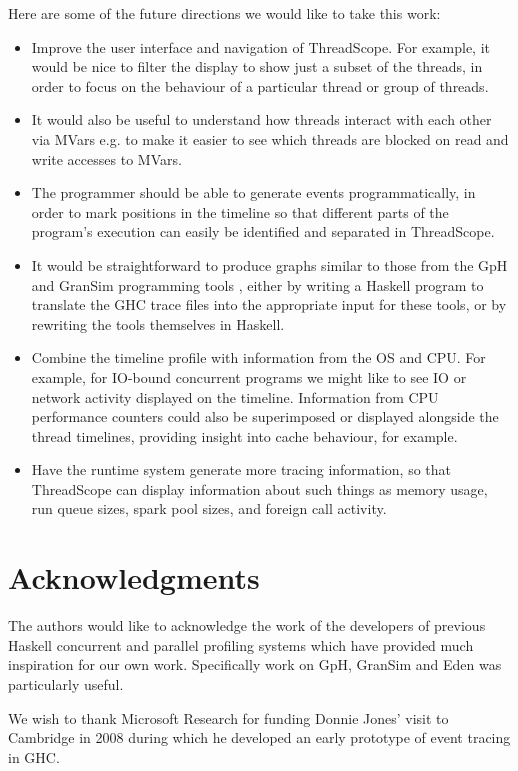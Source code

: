 \documentclass[twocolumn,9pt]{sigplanconf}
\newcommand{\codef}[1]{{\fontfamily{cmss}\small#1}}
\let\cite=\citep
\begin{document}
Here are some of the future directions we would like to take this
work:

\begin{itemize}
\item Improve the user interface and navigation of ThreadScope.  For
  example, it would be nice to filter the display to show just a
  subset of the threads, in order to focus on the behaviour of a
  particular thread or group of threads.

\item It would also be useful to understand how threads interact with each 
   other via \codef{MVars} e.g. to make it easier to see which 
   threads are blocked on read and write accesses to \codef{MVar}s.

\item The programmer should be able to generate events
  programmatically, in order to mark positions in the timeline so that
  different parts of the program's execution can easily be identified
  and separated in ThreadScope.

\item It would be straightforward to produce graphs similar to those
  from the GpH and GranSim programming tools \cite{trinder:02,loidl},
  either by writing a Haskell program to translate the GHC trace files
  into the appropriate input for these tools, or by rewriting the
  tools themselves in Haskell.

\item Combine the timeline profile with information from the OS and
  CPU.  For example, for IO-bound concurrent programs we might like to
  see IO or network activity displayed on the timeline.  Information
  from CPU performance counters could also be superimposed or
  displayed alongside the thread timelines, providing insight into
  cache behaviour, for example.

\item Have the runtime system generate more tracing information, so
  that ThreadScope can display information about such things as memory
  usage, run queue sizes, spark pool sizes, and foreign call activity.
\end{itemize}

\section*{Acknowledgments}

The authors would like to acknowledge the work of the developers
of previous Haskell concurrent and parallel profiling systems
which have provided much inspiration for our own work. Specifically
work on GpH, GranSim and Eden was particularly useful.

We wish to thank Microsoft Research for funding Donnie Jones' visit to
Cambridge in 2008 during which he developed an early prototype of
event tracing in GHC.

{\small


}
\end{document}
